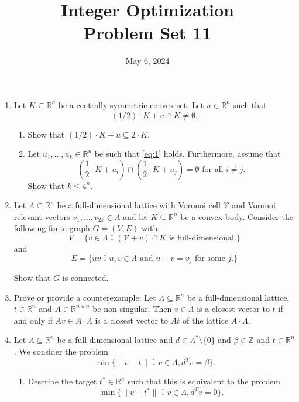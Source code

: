 \documentclass[11pt,a4paper]{article}
\title{Integer Optimization  \\ Problem Set 11 }
\date{ May 6, 2024}
\begin{document}
\maketitle 


\begin{enumerate}

\item Let $K ⊆ ℝ^n$ be a centrally symmetric convex set. Let $u ∈ ℝ^n$ such that
  \begin{equation}
    \label{eq:1}    
    (1/2) ⋅ K  + u ∩ K ≠ ∅.
  \end{equation}
  \begin{enumerate}
  \item Show that $(1/2) ⋅ K  + u ⊆ 2 ⋅K$.
  \item Let $u_1,\dots,u_k ∈ ℝ^n$ be such that \eqref{eq:1} holds. Furthermore, assume that
    \begin{displaymath}
       \left(\frac{1}{2} ⋅ K  + u_i  \right)∩ \left(\frac{1}{2} ⋅ K  + u_j \right)  = ∅ \text{ for all } i≠j.
         \end{displaymath}
Show that $k ≤ 4^n$.          
\end{enumerate}

\item Let $Λ⊆ℝ^n$ be a full-dimensional lattice with Voronoi cell $\mathcal{V}$ and Voronoi relevant vectors $v_1,\dots,v_{2k} ∈ Λ$ and let $K ⊆ ℝ^n$ be a convex body. Consider the following finite graph $G = (V,E)$ with
  \begin{displaymath}
    V = \{ v ∈ Λ ： (\mathcal{V} + v ) ∩ K   \text{ is full-dimensional.} \} 
  \end{displaymath}
  and
  \begin{displaymath}
    E = \{ uv ： u,v ∈ Λ \text{ and } u-v = v_j \text{ for some } j.  \} 
  \end{displaymath}

  Show that $G$ is connected.
\item Prove or provide a counterexample: Let $Λ ⊆ ℝ^n$ be a full-dimensional lattice,  $t ∈ ℝ^n$ and $A ∈ ℝ^{ n×n}$ be non-singular. Then $v ∈ Λ$ is a closest vector to $t$ if and only if $A v ∈ A⋅Λ$ is a closest vector to $At$ of the lattice $A ⋅Λ$. 
  
\item Let $Λ ⊆ ℝ^n$ be a full-dimensional lattice and $d ∈ Λ^* \setminus \{0\}$ and $β ∈ ℤ$ and $t ∈ ℝ^n$. We consider the problem
  \begin{displaymath}
    \min \{ \| v -t \|： v  ∈ Λ, d^T v = β\}. 
  \end{displaymath} 
  \begin{enumerate}
  \item   Describe the target $t^*∈ ℝ^n$  such that this is equivalent to the problem
    \begin{displaymath}
      \min \{ \| v -t^* \|： v  ∈ Λ, d^T v = 0\}.
    \end{displaymath}
  \end{enumerate}


\end{enumerate}
\end{document}
